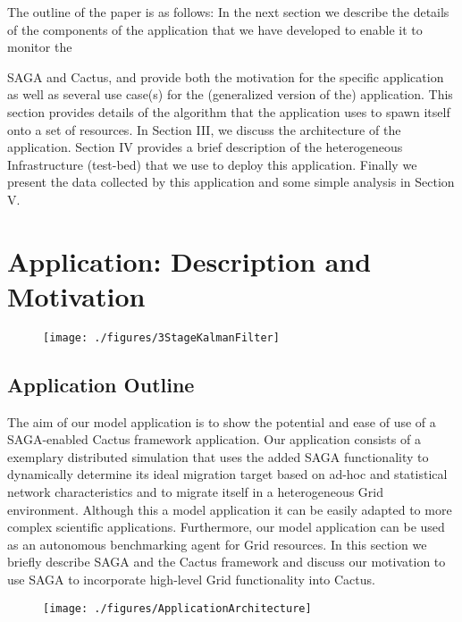 \documentclass[conference,final]{IEEEtran}
\newcommand{\C}{\comment}
\begin{document}
The outline of the paper is as follows: In the next section we
describe the details of the components of the application that we have
developed to enable it to monitor the

SAGA and Cactus, and provide both the motivation for the specific
application as well as several use case(s) for the (generalized
version of the) application. This section provides details of the
algorithm that the application uses to spawn itself onto a set of
resources.  In Section III, we discuss the architecture of the
application. Section IV provides a brief description of the
heterogeneous Infrastructure (test-bed) that we use to deploy this
application. Finally we present the data collected by this application
and some simple analysis in Section V.

\section{Application: Description and Motivation} \C{Yaakoub, Jha}

\begin{figure}
\begin{center}
\texttt{[image: ./figures/3StageKalmanFilter]}
\end{center}
\caption{ }
\label{fig:irregular_execution}
\end{figure}

\subsection{Application Outline}

The aim of our model application is to show the potential and ease of
use of a SAGA-enabled Cactus framework application. Our application
consists of a exemplary distributed simulation that uses the added
SAGA functionality to dynamically determine its ideal migration target
based on ad-hoc and statistical network characteristics and to migrate
itself in a heterogeneous Grid environment.  Although this a model
application it can be easily adapted to more complex scientific
applications.  Furthermore, our model application can be used as an
autonomous benchmarking agent for Grid resources. In this section we
briefly describe SAGA and the Cactus framework and discuss our
motivation to use SAGA to incorporate high-level Grid functionality
into Cactus.



\begin{figure}
\begin{center}
\texttt{[image: ./figures/ApplicationArchitecture]}
\end{center}
\caption{}
\label{fig:application_architecture}
\end{figure}
\end{document}
